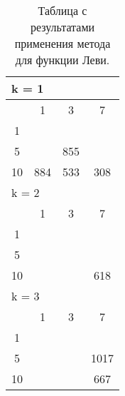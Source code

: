 \begin{table}
  \centering
  \begin{tabular}{|*4{c|}}
    \hline
    \multicolumn{4}{|l|}{k = 1} \\
    \hline
    \diagbox{$\mu$}{$\lambda$} & \multicolumn{1}{c|}{1} & \multicolumn{1}{c|}{3} & \multicolumn{1}{c|}{7} \\
    \hline
    1& \cellcolor{olive}{3496} & \cellcolor{olive}{1980} & \cellcolor{olive}{1321} \\
    \hline
    5& \cellcolor{olive}{1778} & 855 & \cellcolor{olive}{356} \\
    \hline
    10 & 884 & 533 & 308 \\
    \hline
    \multicolumn{4}{|l|}{k = 2} \\
    \hline
    \diagbox{$\mu$}{$\lambda$} & \multicolumn{1}{c|}{1} & \multicolumn{1}{c|}{3} & \multicolumn{1}{c|}{7} \\
    \hline
    1 & \cellcolor{olive}{4947} & \cellcolor{olive}{2020} & \cellcolor{olive}{1205} \\
    \hline
    5 & \cellcolor{olive}{1935} & \cellcolor{olive}{1085} & \cellcolor{olive}{770} \\
    \hline
    10 & \cellcolor{olive}{1803} & \cellcolor{olive}{887} & 618 \\
    \hline
    \multicolumn{4}{|l|}{k = 3} \\
    \hline
    \diagbox{$\mu$}{$\lambda$} & \multicolumn{1}{c|}{1} & \multicolumn{1}{c|}{3} & \multicolumn{1}{c|}{7} \\
    \hline
    1 & \cellcolor{olive}{5216}& \cellcolor{olive}{2900} & \cellcolor{olive}{1700} \\
    \hline
    5 & \cellcolor{olive}{3105} & \cellcolor{olive}{1808} & 1017 \\
    \hline
    10 & \cellcolor{olive}{2071}& \cellcolor{olive}{1330} & 667 \\
    \hline
  \end{tabular}
  \captionsetup{justification=centering}
  \caption{Таблица с результатами применения метода  для функции Леви.}
  \label{adaptive_levi_results}
\end{table}

